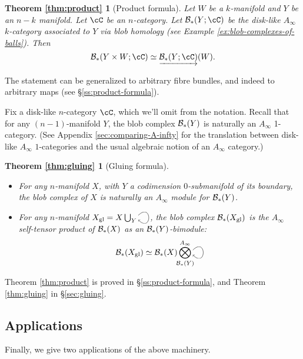 \newtheorem*{thm:product}{Theorem \ref{thm:product}}

\begin{thm:product}[Product formula]
Let $W$ be a $k$-manifold and $Y$ be an $n-k$ manifold.
Let $\cC$ be an $n$-category.
Let $\bc_*(Y;\cC)$ be the disk-like $A_\infty$ $k$-category associated to $Y$ via blob homology 
(see Example \ref{ex:blob-complexes-of-balls}).
Then
\[
	\bc_*(Y\times W; \cC) \simeq \cl{\bc_*(Y;\cC)}(W).
\]
\end{thm:product}
The statement can be generalized to arbitrary fibre bundles, and indeed to arbitrary maps
(see \S \ref{ss:product-formula}).

Fix a disk-like $n$-category $\cC$, which we'll omit from the notation.
Recall that for any $(n{-}1)$-manifold $Y$, the blob complex ${\mathcal B}_*(Y)$ is naturally an $A_\infty$ 1-category.
(See Appendix \ref{sec:comparing-A-infty} for the translation between disk-like $A_\infty$ $1$-categories 
and the usual algebraic notion of an $A_\infty$ category.)

\newtheorem*{thm:gluing}{Theorem \ref{thm:gluing}}

\begin{thm:gluing}[Gluing formula]
\mbox{}%
\begin{itemize}
\item For any $n$-manifold $X$, with $Y$ a codimension $0$-submanifold of its boundary, the blob complex of $X$ is naturally an
$A_\infty$ module for ${\mathcal B}_*(Y)$.

\item For any $n$-manifold $X_\text{gl} = X\bigcup_Y \selfarrow$, the blob complex ${\mathcal B}_*(X_\text{gl})$ 
is the $A_\infty$ self-tensor product of
${\mathcal B}_*(X)$ as an ${\mathcal B}_*(Y)$-bimodule:
\begin{equation*}
\bc_*(X_\text{gl}) \simeq \bc_*(X) \Tensor^{A_\infty}_{\mathclap{\bc_*(Y)}} \selfarrow
\end{equation*}
\end{itemize}
\end{thm:gluing}

Theorem \ref{thm:product} is proved in \S \ref{ss:product-formula}, and Theorem \ref{thm:gluing} in \S \ref{sec:gluing}.

\subsection{Applications}
\label{sec:applications}
Finally, we give two applications of the above machinery.

